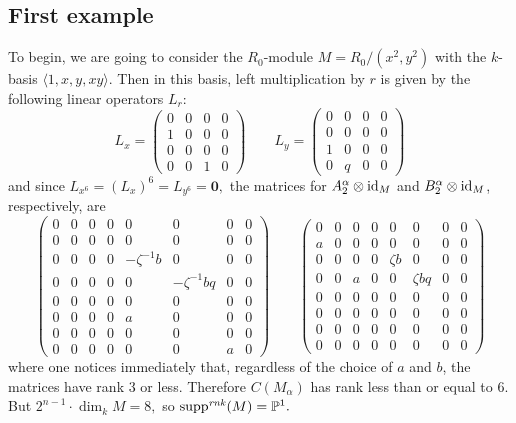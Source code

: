 \documentclass [11pt, proquest] {uwthesis}[2020/02/24]
\DeclareMathOperator{\suppr}{supp^\mathit{rnk}}
\begin{document}
\subsection{First example}
    To begin, we are going to consider the $R_0$-module $M=R_0/(x^2,y^2)$ with the $k$-basis $\langle 1,x,y,xy\rangle.$ Then in this basis, left multiplication by $r$ is given by the following linear operators $L_r$:
    \[L_x=\begin{pmatrix}
        0 & 0 & 0 & 0\\
        1 & 0 & 0 & 0\\
        0 & 0 & 0 & 0\\
        0 & 0 & 1 & 0
    \end{pmatrix}\qquad L_y=\begin{pmatrix}
        0 & 0 & 0 & 0\\
        0 & 0 & 0 & 0\\
        1 & 0 & 0 & 0\\
        0 & q & 0 & 0
    \end{pmatrix}\]
    and since $L_{x^6}=(L_x)^6=L_{y^6}=\mathbf{0},$ the matrices for $A_2^\alpha\otimes \operatorname{id}_M$ and $B_2^\alpha\otimes \operatorname{id}_M$, respectively, are
    \[\begin{pmatrix}
        0&0&0&0 & 0 & 0 & 0 & 0\\
        0&0&0&0 & 0 & 0 & 0 & 0\\
        0&0&0&0 & -\zeta^{-1}b & 0 & 0 & 0\\
        0&0&0&0 & 0 & -\zeta^{-1}bq & 0 & 0\\
        0&0&0&0 & 0 & 0 & 0 & 0\\
        0&0&0&0 & a & 0 & 0 & 0\\
        0&0&0&0 & 0 & 0 & 0 & 0\\
        0&0&0&0 & 0 & 0 & a & 0
    \end{pmatrix}\qquad\begin{pmatrix}
        0 & 0 & 0 & 0 & 0 & 0 & 0 & 0\\
        a & 0 & 0 & 0 & 0 & 0 & 0 & 0\\
        0 & 0 & 0 & 0 & \zeta b & 0 & 0 & 0\\
        0 & 0 & a & 0 & 0 & \zeta bq & 0 & 0\\
         0&0&0&0&0&0&0&0\\
         0&0&0&0&0&0&0&0\\
         0&0&0&0&0&0&0&0\\
         0&0&0&0&0&0&0&0
    \end{pmatrix}\]
    where one notices immediately that, regardless of the choice of $a$ and $b$, the matrices have rank 3 or less. Therefore $C(M_\alpha)$ has rank less than or equal to 6. But $2^{n-1}\cdot \dim_k M=8,$ so $\suppr(M)=\bbP^1.$
\end{document}
